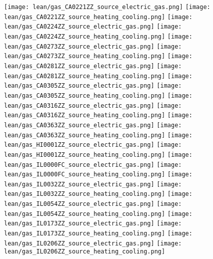 \texttt{[image: lean/gas\_CA0221ZZ\_source\_electric\_gas.png]}
\texttt{[image: lean/gas\_CA0221ZZ\_source\_heating\_cooling.png]}
\texttt{[image: lean/gas\_CA0224ZZ\_source\_electric\_gas.png]}
\texttt{[image: lean/gas\_CA0224ZZ\_source\_heating\_cooling.png]}
\texttt{[image: lean/gas\_CA0273ZZ\_source\_electric\_gas.png]}
\texttt{[image: lean/gas\_CA0273ZZ\_source\_heating\_cooling.png]}
\texttt{[image: lean/gas\_CA0281ZZ\_source\_electric\_gas.png]}
\texttt{[image: lean/gas\_CA0281ZZ\_source\_heating\_cooling.png]}
\texttt{[image: lean/gas\_CA0305ZZ\_source\_electric\_gas.png]}
\texttt{[image: lean/gas\_CA0305ZZ\_source\_heating\_cooling.png]}
\texttt{[image: lean/gas\_CA0316ZZ\_source\_electric\_gas.png]}
\texttt{[image: lean/gas\_CA0316ZZ\_source\_heating\_cooling.png]}
\texttt{[image: lean/gas\_CA0363ZZ\_source\_electric\_gas.png]}
\texttt{[image: lean/gas\_CA0363ZZ\_source\_heating\_cooling.png]}
\texttt{[image: lean/gas\_HI0001ZZ\_source\_electric\_gas.png]}
\texttt{[image: lean/gas\_HI0001ZZ\_source\_heating\_cooling.png]}
\texttt{[image: lean/gas\_IL0000FC\_source\_electric\_gas.png]}
\texttt{[image: lean/gas\_IL0000FC\_source\_heating\_cooling.png]}
\texttt{[image: lean/gas\_IL0032ZZ\_source\_electric\_gas.png]}
\texttt{[image: lean/gas\_IL0032ZZ\_source\_heating\_cooling.png]}
\texttt{[image: lean/gas\_IL0054ZZ\_source\_electric\_gas.png]}
\texttt{[image: lean/gas\_IL0054ZZ\_source\_heating\_cooling.png]}
\texttt{[image: lean/gas\_IL0173ZZ\_source\_electric\_gas.png]}
\texttt{[image: lean/gas\_IL0173ZZ\_source\_heating\_cooling.png]}
\texttt{[image: lean/gas\_IL0206ZZ\_source\_electric\_gas.png]}
\texttt{[image: lean/gas\_IL0206ZZ\_source\_heating\_cooling.png]}
